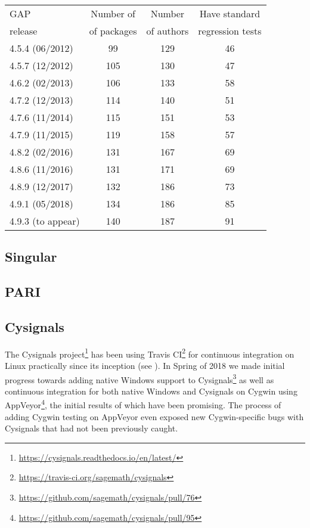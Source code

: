 \documentclass{deliverablereport}
\begin{document}
\begin{center}
\begin{tabular}{ |l|c|c|c| } 
\hline
GAP           & Number of    & Number     & Have standard \\
release       & of packages  & of authors & regression tests \\
\hline
4.5.4 (06/2012) &  99 & 129 & 46 \\
4.5.7 (12/2012) & 105 & 130 & 47 \\
4.6.2 (02/2013) & 106 & 133 & 58 \\
4.7.2 (12/2013) & 114 & 140 & 51 \\
4.7.6 (11/2014) & 115 & 151 & 53 \\
4.7.9 (11/2015) & 119 & 158 & 57 \\
4.8.2 (02/2016) & 131 & 167 & 69 \\
4.8.6 (11/2016) & 131 & 171 & 69 \\
4.8.9 (12/2017) & 132 & 186 & 73 \\
4.9.1 (05/2018) & 134 & 186 & 85 \\
4.9.3 (to appear) & 140 & 187 & 91 \\
\hline
\end{tabular}
\end{center} 


\subsection{Singular}



\subsection{PARI}


\subsection{Cysignals}

The Cysignals
project\footnote{\url{https://cysignals.readthedocs.io/en/latest/}} has been
using Travis CI\footnote{\url{https://travis-ci.org/sagemath/cysignals}} for
continuous integration on Linux practically since its inception (see ).  In Spring of 2018 we made
initial progress towards adding native Windows support to
Cysignals\footnote{\url{https://github.com/sagemath/cysignals/pull/76}} as well
as continuous integration for both native Windows and Cysignals on Cygwin using
AppVeyor\footnote{\url{https://github.com/sagemath/cysignals/pull/95}}, the
initial results of which have been promising.  The process of adding Cygwin
testing on AppVeyor even exposed new Cygwin-specific bugs with Cysignals that
had not been previously caught.
\end{document}
